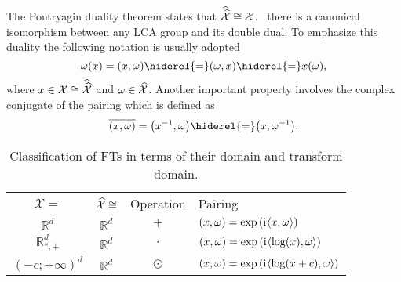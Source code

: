 \paragraph{}
The Pontryagin duality theorem states that $\widehat{\widehat{\mathcal{X}}}\cong \mathcal{X}$. \Ie~there is a canonical isomorphism between any \acs{LCA} group and its double dual. To emphasize this duality the following notation is usually adopted
\begin{dmath}
\omega(x)=\pairing{x,\omega}\hiderel{=}\pairing{\omega,x}\hiderel{=}x(\omega),
\end{dmath}
where $x\in\mathcal{X}\cong\widehat{\widehat{\mathcal{X}}}$ and $\omega\in\widehat{\mathcal{X}}$. Another important property involves the complex conjugate of the pairing which is defined as
\begin{dmath}
\conj{\pairing{x,\omega}} = \pairing*{\inv{x},\omega}\hiderel{=}\pairing*{x,\inv{\omega}}.
\end{dmath}
\begin{table}[!ht]
\caption{Classification of \acl{FT}s in terms of their domain and transform domain.}
\label{tab:dual_and_pairing}
\centering
\begin{tabularx}{\textwidth}{cccX}
\toprule
\multicolumn{1}{c}{$\mathcal{X}=$} & \multicolumn{1}{c}{$\widehat{\mathcal{X}}\cong$} & \multicolumn{1}{c}{Operation} & \multicolumn{1}{l}{Pairing} \\
\cmidrule{1-4}
$\mathbb{R}^d$ & $\mathbb{R}^d$ & $+$ & $(x,\omega) = \exp\left({\mathrm{i}\mkern1mu} \langle x, \omega\rangle\right)$ \\
$\mathbb{R}^d_{*,+}$ & $\mathbb{R}^d$ & $\cdot$ & $(x,\omega) =\exp\left( {\mathrm{i}\mkern1mu} \langle\log(x), \omega\rangle \right)$ \\
$(-c;+\infty)^d$ & $\mathbb{R}^d$ & $\odot$ & $(x,\omega) =\exp\left( {\mathrm{i}\mkern1mu} \langle\log(x+c), \omega\rangle \right)$ \\
\bottomrule
\end{tabularx}
\end{table}
